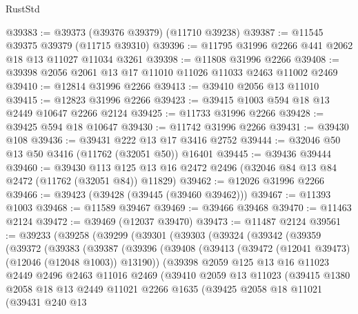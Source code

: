 \begin{lexlean}{RustStd}
\begin{coremodule}
@39383 := @39373 (@39376 @39379) (@11710 @39238)
@39387 := @11545 @39375 @39379 (@11715 @39310)
@39396 := @11795 @31996 @2266 @441 @2062 @18 @13 @11027 @11034 @3261
@39398 := @11808 @31996 @2266
@39408 := @39398 @2056 @2061 @13 @17 @11010 @11026 @11033 @2463 @11002 @2469
@39410 := @12814 @31996 @2266
@39413 := @39410 @2056 @13 @11010
@39415 := @12823 @31996 @2266
@39423 := @39415 @1003 @594 @18 @13 @2449 @10647 @2266 @2124
@39425 := @11733 @31996 @2266
@39428 := @39425 @594 @18 @10647
@39430 := @11742 @31996 @2266
@39431 := @39430 @108
@39436 := @39431 @222 @13 @17 @3416 @2752
@39444 := @32046 @50 @13 @50 @3416 (@11762 (@32051 @50)) @16401
@39445 := @39436 @39444
@39460 := @39430
    @113
    @125
    @13
    @16
    @2472
    @2496
    (@32046 @84 @13 @84 @2472 (@11762 (@32051 @84)) @11829)
@39462 := @12026 @31996 @2266
@39466 := @39423 (@39428 (@39445 (@39460 @39462)))
@39467 := @11393 @1003
@39468 := @11589 @39467
@39469 := @39466 @39468
@39470 := @11463 @2124
@39472 := @39469 (@12037 @39470)
@39473 := @11487 @2124
@39561 := @39233
    (@39258
      (@39299
        (@39301
          (@39303
            (@39324
              (@39342
                (@39359
                  (@39372
                    (@39383
                      (@39387
                        (@39396
                          (@39408
                            (@39413 (@39472 (@12041 @39473) (@12046 (@12048 @1003)) @13190))
                            (@39398
                              @2059
                              @125
                              @13
                              @16
                              @11023
                              @2449
                              @2496
                              @2463
                              @11016
                              @2469
                              (@39410
                                @2059
                                @13
                                @11023
                                (@39415
                                  @1380
                                  @2058
                                  @18
                                  @13
                                  @2449
                                  @11021
                                  @2266
                                  @1635
                                  (@39425
                                    @2058
                                    @18
                                    @11021
                                    (@39431
                                      @240
                                      @13

\end{coremodule}
\end{lexlean}
